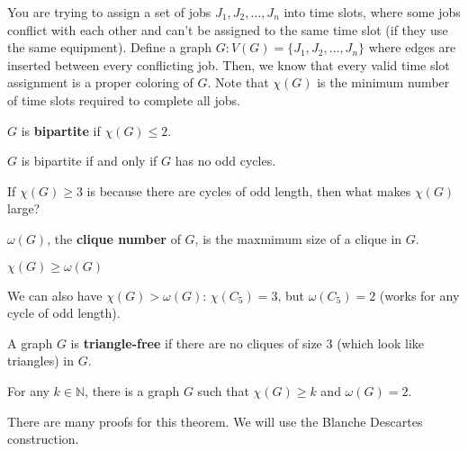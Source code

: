 \documentclass[a4paper]{article}
\begin{document}
\begin{eg}
	You are trying to assign a set of jobs \( J_{1}, J_2, \ldots , J_n \) into time slots, where some jobs conflict with each other and can't be assigned to the same time slot (if they use the same equipment). Define a graph \( G \colon V(G) = \{J_{1}, J_{2},\ldots , J_n \}   \) where edges are inserted between every conflicting job. Then, we know that every valid time slot assignment is a proper coloring of \( G \). Note that \( \chi (G) \) is the minimum number of time slots required to complete all jobs.
\end{eg}

\begin{definition}
	\( G \) is \textbf{bipartite} if \( \chi(G) \le 2 \).
\end{definition}

\begin{theorem}
	\( G \) is bipartite if and only if \( G \) has no odd cycles.
\end{theorem}

If \( \chi(G) \ge 3 \) is because there are cycles of odd length, then what makes \( \chi (G) \) large?

\begin{definition}
	\( \omega(G) \), the \textbf{clique number} of \( G \), is the maxmimum size of a clique in \( G \).
\end{definition}

\begin{property}
	\( \chi(G) \ge \omega (G) \)
\end{property}

\begin{note}
	We can also have \( \chi(G) > \omega (G) \): \( \chi (C_5) = 3\), but \( \omega (C_5) = 2\) (works for any cycle of odd length).
\end{note}

\begin{definition}
	A graph \( G \) is \textbf{triangle-free} if there are no cliques of size 3 (which look like triangles) in \( G \).
\end{definition}

\begin{theorem}
	For any \( k \in \mathbb{N} \), there is a graph \( G \) such that \( \chi (G) \ge k \) and \( \omega (G) = 2 \).
\end{theorem}

There are many proofs for this theorem. We will use the Blanche Descartes construction.
\end{document}
